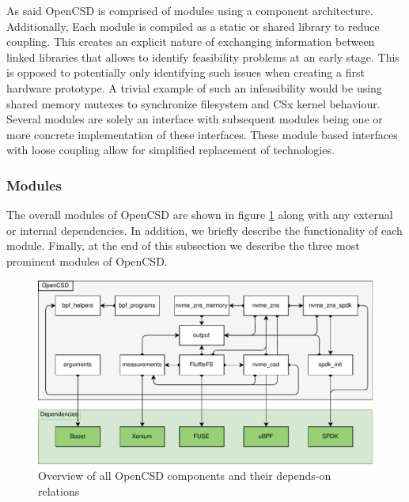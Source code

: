 
As said OpenCSD is comprised of modules using a component architecture.
Additionally, Each module is compiled as a static or shared library to reduce
coupling. This creates an explicit nature of exchanging information between
linked libraries that allows to identify feasibility problems at an early stage.
This is opposed to potentially only identifying such issues when creating a
first hardware prototype. A trivial example of such an infeasibility would be
using shared memory mutexes to synchronize filesystem and CSx kernel behaviour.
Several modules are solely an interface with subsequent modules being one or
more concrete implementation of these interfaces. These module based interfaces
with loose coupling allow for simplified replacement of technologies.

\subsubsection{Modules}

The overall modules of OpenCSD are shown in figure
\ref{figure:moduledependencies} along with any external or internal
dependencies. In addition, we briefly describe the functionality of each module.
Finally, at the end of this subsection we describe the three most prominent
modules of OpenCSD.


\begin{figure}
    \centering
	\includegraphics[width=1\textwidth]{resources/images/module-dependencies.pdf}
	\caption{Overview of all OpenCSD components and their depends-on relations}
    \label{figure:moduledependencies}
\end{figure}

